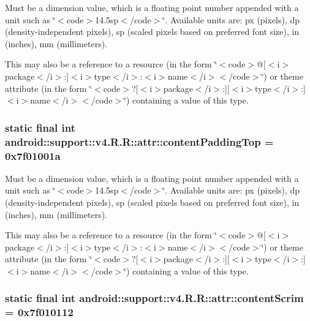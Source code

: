 Must be a dimension value, which is a floating point number appended with a unit such as \char`\"{}$<$code$>$14.5sp$<$/code$>$\char`\"{}. Available units are: px (pixels), dp (density-independent pixels), sp (scaled pixels based on preferred font size), in (inches), mm (millimeters). 

This may also be a reference to a resource (in the form \char`\"{}$<$code$>$@\mbox{[}$<$i$>$package$<$/i$>$:\mbox{]}$<$i$>$type$<$/i$>$:$<$i$>$name$<$/i$>$$<$/code$>$\char`\"{}) or theme attribute (in the form \char`\"{}$<$code$>$?\mbox{[}$<$i$>$package$<$/i$>$:\mbox{]}\mbox{[}$<$i$>$type$<$/i$>$:\mbox{]}$<$i$>$name$<$/i$>$$<$/code$>$\char`\"{}) containing a value of this type. \hypertarget{classandroid_1_1support_1_1v4_1_1_r_1_1attr_901ecbaac834e8d01ec8950a1dd259a8}{
\subsubsection[{contentPaddingTop}]{\setlength{\rightskip}{0pt plus 5cm}static final int android::support::v4.R.R::attr::contentPaddingTop = 0x7f01001a}}
\label{classandroid_1_1support_1_1v4_1_1_r_1_1attr_901ecbaac834e8d01ec8950a1dd259a8}


Must be a dimension value, which is a floating point number appended with a unit such as \char`\"{}$<$code$>$14.5sp$<$/code$>$\char`\"{}. Available units are: px (pixels), dp (density-independent pixels), sp (scaled pixels based on preferred font size), in (inches), mm (millimeters). 

This may also be a reference to a resource (in the form \char`\"{}$<$code$>$@\mbox{[}$<$i$>$package$<$/i$>$:\mbox{]}$<$i$>$type$<$/i$>$:$<$i$>$name$<$/i$>$$<$/code$>$\char`\"{}) or theme attribute (in the form \char`\"{}$<$code$>$?\mbox{[}$<$i$>$package$<$/i$>$:\mbox{]}\mbox{[}$<$i$>$type$<$/i$>$:\mbox{]}$<$i$>$name$<$/i$>$$<$/code$>$\char`\"{}) containing a value of this type. \hypertarget{classandroid_1_1support_1_1v4_1_1_r_1_1attr_4f33fc74e7bafcc4747d8850bb962677}{
\subsubsection[{contentScrim}]{\setlength{\rightskip}{0pt plus 5cm}static final int android::support::v4.R.R::attr::contentScrim = 0x7f010112}}
\label{classandroid_1_1support_1_1v4_1_1_r_1_1attr_4f33fc74e7bafcc4747d8850bb962677}


